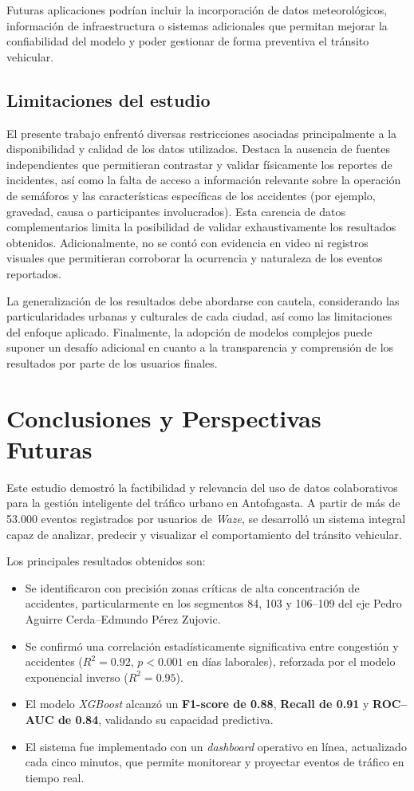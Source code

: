 \documentclass[12pt]{article}
\begin{document}
Futuras aplicaciones podrían incluir la incorporación de datos meteorológicos, información de infraestructura o sistemas adicionales que permitan mejorar la confiabilidad del modelo y poder gestionar de forma preventiva el tránsito vehicular.

\subsection{Limitaciones del estudio}

El presente trabajo enfrentó diversas restricciones asociadas principalmente a la disponibilidad y calidad de los datos utilizados. Destaca la ausencia de fuentes independientes que permitieran contrastar y validar físicamente los reportes de incidentes, así como la falta de acceso a información relevante sobre la operación de semáforos y las características específicas de los accidentes (por ejemplo, gravedad, causa o participantes involucrados). Esta carencia de datos complementarios limita la posibilidad de validar exhaustivamente los resultados obtenidos. Adicionalmente, no se contó con evidencia en video ni registros visuales que permitieran corroborar la ocurrencia y naturaleza de los eventos reportados.

La generalización de los resultados debe abordarse con cautela, considerando las particularidades urbanas y culturales de cada ciudad, así como las limitaciones del enfoque aplicado. Finalmente, la adopción de modelos complejos puede suponer un desafío adicional en cuanto a la transparencia y comprensión de los resultados por parte de los usuarios finales.

\section{Conclusiones y Perspectivas Futuras}

Este estudio demostró la factibilidad y relevancia del uso de datos colaborativos para la gestión inteligente del tráfico urbano en Antofagasta. A partir de más de 53.000 eventos registrados por usuarios de \textit{Waze}, se desarrolló un sistema integral capaz de analizar, predecir y visualizar el comportamiento del tránsito vehicular.

Los principales resultados obtenidos son:
\begin{itemize}
\item Se identificaron con precisión zonas críticas de alta concentración de accidentes, particularmente en los segmentos 84, 103 y 106–109 del eje Pedro Aguirre Cerda–Edmundo Pérez Zujovic.
\item Se confirmó una correlación estadísticamente significativa entre congestión y accidentes ($R^2 = 0.92$, $p < 0.001$ en días laborales), reforzada por el modelo exponencial inverso ($R^2 = 0.95$).
\item El modelo \textit{XGBoost} alcanzó un \textbf{F1-score de 0.88}, \textbf{Recall de 0.91} y \textbf{ROC–AUC de 0.84}, validando su capacidad predictiva.
\item El sistema fue implementado con un \textit{dashboard} operativo en línea, actualizado cada cinco minutos, que permite monitorear y proyectar eventos de tráfico en tiempo real.
\end{itemize}
\end{document}
